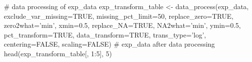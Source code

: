 \documentclass[]{article}
\begin{document}
# data processing of exp_data
exp_transform_table <- data_process(exp_data, exclude_var_missing=TRUE,
                                    missing_pct_limit=50,
                                    replace_zero=TRUE, zero2what='min',
                                    xmin=0.5, replace_NA=TRUE,
                                    NA2what='min', ymin=0.5,
                                    pct_transform=TRUE,
                                    data_transform=TRUE, trans_type='log',
                                    centering=FALSE, scaling=FALSE)
# exp_data after data processing
head(exp_transform_table[, 1:5], 5)


  \providecommand{\huxb}[2]{\arrayrulecolor[RGB]{#1}\global\arrayrulewidth=#2pt}
  \providecommand{\huxvb}[2]{\color[RGB]{#1}\vrule width #2pt}
  \providecommand{\huxtpad}[1]{\rule{0pt}{#1}}
  \providecommand{\huxbpad}[1]{\rule[-#1]{0pt}{#1}}
\end{document}
